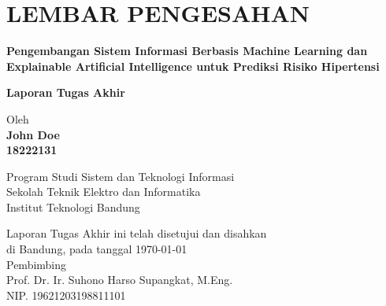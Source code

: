 \chapter*{LEMBAR PENGESAHAN}


\begin{center}
    \vspace{2cm}
  {\large\bfseries Pengembangan Sistem Informasi Berbasis Machine Learning dan Explainable Artificial Intelligence untuk Prediksi Risiko Hipertensi}\\
     \vspace{2cm}

  {\Large \textbf{Laporan Tugas Akhir}}\\


  \vspace{1.5cm}
    
    
  {\large Oleh}\\[0.3cm]
    \textbf{
    {\large John Doe}\\
    {\large 18222131}
  }\\
    
  \vspace{0.5cm}
 
  {\large Program Studi Sistem dan Teknologi Informasi}\\
  {\large Sekolah Teknik Elektro dan Informatika}\\
  {\large Institut Teknologi Bandung}\\

  \vspace{1.5cm}

  Laporan Tugas Akhir ini telah disetujui dan disahkan\\ 
  di Bandung, pada tanggal \today\\[1cm]

	Pembimbing  \\[3cm]
	Prof. Dr. Ir. Suhono Harso Supangkat, M.Eng.   \\[0.2cm]
	NIP. 19621203198811101 

\end{center}

\vspace{1cm}
\noindent



